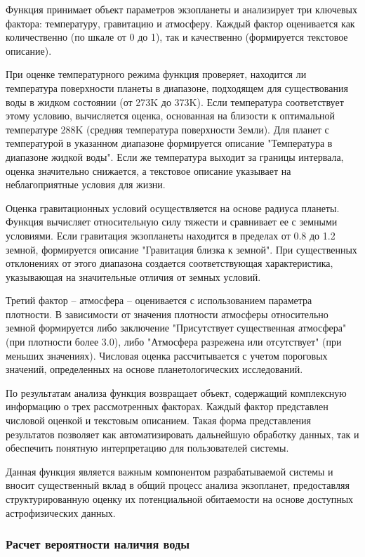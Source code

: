 Функция принимает объект параметров экзопланеты и анализирует три ключевых фактора: температуру, гравитацию и атмосферу. Каждый фактор оценивается как количественно (по шкале от 0 до 1), так и качественно (формируется текстовое описание).

При оценке температурного режима функция проверяет, находится ли температура поверхности планеты в диапазоне, подходящем для существования воды в жидком состоянии (от 273K до 373K). Если температура соответствует этому условию, вычисляется оценка, основанная на близости к оптимальной температуре 288K (средняя температура поверхности Земли). Для планет с температурой в указанном диапазоне формируется описание "Температура в диапазоне жидкой воды". Если же температура выходит за границы интервала, оценка значительно снижается, а текстовое описание указывает на неблагоприятные условия для жизни.

Оценка гравитационных условий осуществляется на основе радиуса планеты. Функция вычисляет относительную силу тяжести и сравнивает ее с земными условиями. Если гравитация экзопланеты находится в пределах от 0.8 до 1.2 земной, формируется описание "Гравитация близка к земной". При существенных отклонениях от этого диапазона создается соответствующая характеристика, указывающая на значительные отличия от земных условий.

Третий фактор – атмосфера – оценивается с использованием параметра плотности. В зависимости от значения плотности атмосферы относительно земной формируется либо заключение "Присутствует существенная атмосфера" (при плотности более 3.0), либо "Атмосфера разрежена или отсутствует" (при меньших значениях). Числовая оценка рассчитывается с учетом пороговых значений, определенных на основе планетологических исследований.

По результатам анализа функция возвращает объект, содержащий комплексную информацию о трех рассмотренных факторах. Каждый фактор представлен числовой оценкой и текстовым описанием. Такая форма представления результатов позволяет как автоматизировать дальнейшую обработку данных, так и обеспечить понятную интерпретацию для пользователей системы.

Данная функция является важным компонентом разрабатываемой системы и вносит существенный вклад в общий процесс анализа экзопланет, предоставляя структурированную оценку их потенциальной обитаемости на основе доступных астрофизических данных.

\subsubsection{Расчет вероятности наличия воды}

